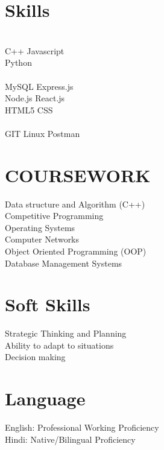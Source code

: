 \documentclass[]{deedy-resume-openfont}
\begin{document}
\begin{minipage}[t]{0.33\textwidth}
\section{Skills}
\\
\textbullet{} C++ \textbullet{} Javascript \\
 \textbullet{} Python 
   \\
   

\\
 \textbullet{} MySQL 
\textbullet{}Express.js  \\ \textbullet{} Node.js
\textbullet{} React.js \\ \textbullet{}  HTML5  \textbullet{}CSS \\
 
\\
\textbullet{} GIT \textbullet{}Linux \textbullet{}Postman
\sectionsep


\section{COURSEWORK}

\textbullet{}Data structure and Algorithm (C++) \\
\textbullet{}Competitive Programming\\
\textbullet{}Operating Systems\\
\textbullet{}Computer Networks\\
\textbullet{}Object Oriented Programming (OOP)\\
\textbullet{}Database Management Systems\\






\section{Soft Skills}
 \textbullet{}Strategic Thinking and Planning\\
\textbullet{}Ability to adapt to situations\\
 \textbullet{}Decision making
 \sectionsep
 
 \section{Language}
 \textbullet{}English: Professional Working Proficiency\\
\textbullet{}Hindi: Native/Bilingual Proficiency\\
 
 \sectionsep
%
%

\end{minipage} 
\end{document}
